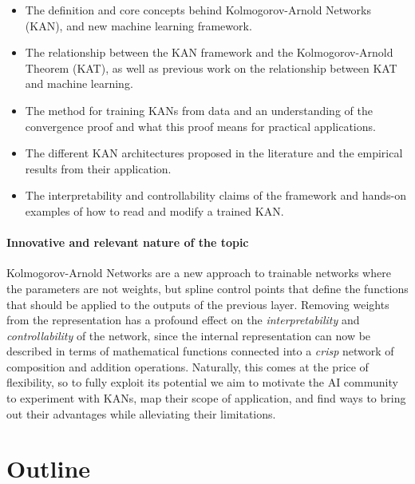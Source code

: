 \documentclass{ecai}
\begin{document}
\begin{itemize}
\item The definition and core concepts behind Kolmogorov-Arnold
  Networks (KAN), and new machine learning framework.
\item The relationship between the KAN framework and the
  Kolmogorov-Arnold Theorem (KAT), as well as previous
  work on the relationship between KAT and machine learning.
\item The method for training KANs from data and an understanding of
  the convergence proof and what this proof means for practical
  applications.
\item The different KAN architectures 
  proposed in the literature and the empirical results from their
  application.
\item The interpretability and controllability claims of the
  framework and hands-on examples of how to read and modify a trained
  KAN.
\end{itemize}



\paragraph{Innovative and relevant nature of the topic}

Kolmogorov-Arnold Networks are a new approach to trainable networks
where the parameters are not weights, but spline control points that
define the functions that should be applied to the outputs of the
previous layer. Removing weights from the representation has a
profound effect on the \emph{interpretability} and
\emph{controllability} of the network, since the internal
representation can now be described in terms of mathematical functions
connected into a \emph{crisp} network of composition and addition
operations.
%
Naturally, this comes at the price of flexibility, so to fully exploit
its potential we aim to motivate the AI community to experiment with
KANs, map their scope of application, and find ways to bring out their
advantages while alleviating their limitations.


\section{Outline}
\end{document}
